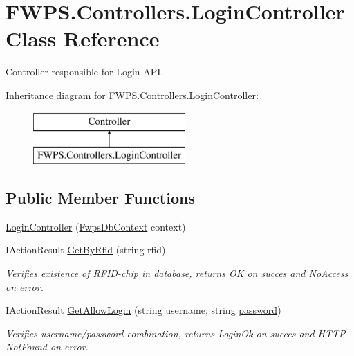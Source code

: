 \hypertarget{class_f_w_p_s_1_1_controllers_1_1_login_controller}{}\section{F\+W\+P\+S.\+Controllers.\+Login\+Controller Class Reference}
\label{class_f_w_p_s_1_1_controllers_1_1_login_controller}


Controller responsible for Login A\+PI.  


Inheritance diagram for F\+W\+P\+S.\+Controllers.\+Login\+Controller\+:\begin{figure}[H]
\begin{center}
\leavevmode
\includegraphics[height=2.000000cm]{class_f_w_p_s_1_1_controllers_1_1_login_controller}
\end{center}
\end{figure}
\subsection*{Public Member Functions}
\begin{DoxyCompactItemize}
\item 
\mbox{\hyperlink{class_f_w_p_s_1_1_controllers_1_1_login_controller_aad78f00742e686dc138c6fd0ddd55adb}{Login\+Controller}} (\mbox{\hyperlink{class_f_w_p_s_1_1_data_1_1_fwps_db_context}{Fwps\+Db\+Context}} context)
\item 
I\+Action\+Result \mbox{\hyperlink{class_f_w_p_s_1_1_controllers_1_1_login_controller_a49bddd8fd1e610b022ce02189d3d8444}{Get\+By\+Rfid}} (string rfid)
\begin{DoxyCompactList}\small\item\em Verifies existence of R\+F\+I\+D-\/chip in database, returns \textquotesingle{}OK\textquotesingle{} on succes and \textquotesingle{}No\+Access\textquotesingle{} on error. \end{DoxyCompactList}\item 
I\+Action\+Result \mbox{\hyperlink{class_f_w_p_s_1_1_controllers_1_1_login_controller_a80569095f4a0d5bf8e68c45a192307cc}{Get\+Allow\+Login}} (string username, string \mbox{\hyperlink{_snap_box_8ino_aa4a2ebcb494493f648ae1e6975672575}{password}})
\begin{DoxyCompactList}\small\item\em Verifies username/password combination, returns \textquotesingle{}Login\+Ok\textquotesingle{} on succes and H\+T\+TP Not\+Found on error. \end{DoxyCompactList}\end{DoxyCompactItemize}
